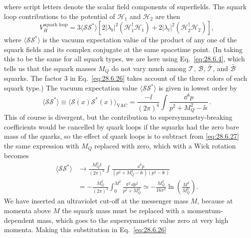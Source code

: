 where script letters denote the scalar field components of superfields.
The squark loop contributions to the potential of \(\mathcal{H}_1\) and
\(\mathcal{H}_2\) are then
\begin{equation}
  V_H^{\text{squark loop}}
  =3\langle\mathcal{S}\mathcal{S}^*\rangle
  \left[
    2\lvert\lambda_b\rvert^2(\mathcal{H}_1^\dagger\mathcal{H}_1)
    +2\lvert\lambda_t\rvert^2(\mathcal{H}_2^\dagger\mathcal{H}_2)
  \right],
  \tag{28.6.26}\label{eq:28.6.26}
\end{equation}
where \(\langle\mathcal{S}\mathcal{S}^*\rangle\) is the vacuum expectation
value of the product of any one of the squark fields and its complex
conjugate at the same spacetime point. (In taking this to be the same for
all squark types, we are here using Eq.~\eqref{eq:28.6.4}, which tells us
that the squark masses \(M_Q\) do not vary much among
\(\mathcal{T}\), \(\mathcal{B}\), \(\bar{\mathcal{T}}\), and
\(\bar{\mathcal{B}}\) squarks. The factor 3 in Eq.~\eqref{eq:28.6.26}
takes account of the three colors of each squark type.) The vacuum
expectation value \(\langle\mathcal{S}\mathcal{S}^*\rangle\) is given in
lowest order by
\begin{equation}
  \langle\mathcal{S}\mathcal{S}^*\rangle
  \equiv
  \langle\mathcal{S}(x)\mathcal{S}^*(x)\rangle_{\mathrm{VAC}}
  =\frac{-\ii}{(2\pi)^4}\int
    \frac{\dd^4p}{p^2+M_Q^2-\ii\epsilon}\,.
  \tag{28.6.27}\label{eq:28.6.27}
\end{equation}
This of course is divergent, but the contribution to supersymmetry-breaking
coefficients would be cancelled by quark loops if the squarks had the zero
bare mass of the quarks, so the effect of quark loops is to subtract from
\eqref{eq:28.6.27} the same expression with \(M_Q\) replaced with zero,
which with a Wick rotation becomes
\[
  \begin{aligned}
    \langle\mathcal{S}\mathcal{S}^*\rangle
    &\longrightarrow
    \frac{M_Q^2\ii}{(2\pi)^4}\int
      \frac{\dd^4p}
      {(p^2+M_Q^2-\ii\epsilon)(p^2-\ii\epsilon)}\\
    &=-\frac{M_Q^2}{(2\pi)^4}\int_0^{M^2}
      \frac{\pi^2\,\dd p^2}{p^2+M_Q^2}
    \simeq-\frac{M_Q^2}{16\pi^2}
      \ln\left(\frac{M^2}{M_Q^2}\right).
  \end{aligned}
\]
We have inserted an ultraviolet cut-off at the messenger mass \(M\),
because at momenta above \(M\) the squark mass must be replaced with a
momentum-dependent mass, which goes to the supersymmetric value zero at
very high momenta. Making this substitution in Eq.~\eqref{eq:28.6.26}
